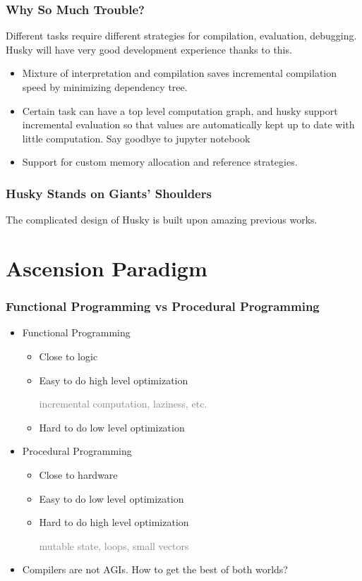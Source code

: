 \documentclass{beamer}   	%
\theoremstyle{definition}
\begin{document}
\begin{frame}
\frametitle{Why So Much Trouble?}
Different tasks require different strategies for compilation, evaluation, debugging. Husky will have very good development experience thanks to this.

\begin{itemize}
	\item Mixture of interpretation and compilation saves incremental compilation speed by minimizing dependency tree.
	\item Certain task can have a top level computation graph, and husky support incremental evaluation so that values are automatically kept up to date with little computation. Say goodbye to jupyter notebook
	\item Support for custom memory allocation and reference strategies.
\end{itemize}
\end{frame}

\begin{frame}
\frametitle{Husky Stands on Giants' Shoulders}

The complicated design of Husky is built upon amazing previous works.
\end{frame}

\section{Ascension Paradigm}

\begin{frame}
\frametitle{Functional Programming vs Procedural Programming}
\begin{itemize}
	\item Functional Programming
	\begin{itemize}
		\item Close to logic
		\item Easy to do high level optimization

		\textcolor{gray}{incremental computation, laziness, etc.}
		\item Hard to do low level optimization
	\end{itemize}
	\item Procedural Programming
	\begin{itemize}
		\item Close to hardware
		\item Easy to do low level optimization
		\item Hard to do high level optimization

		\textcolor{gray}{mutable state, loops, small vectors}
	\end{itemize}
	\item Compilers are not AGIs. How to get the best of both worlds?
\end{itemize}
\end{frame}
\end{document}
